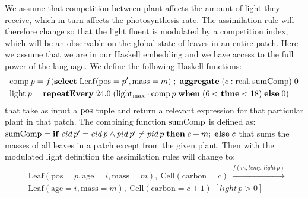 We assume that competition between plant affects the amount of light they
receive, which in turn affects the photosynthesis rate. The assimilation rule
will therefore change so that the light fluent is modulated by a competition
index, which will be an observable on the global state of leaves in an entire
patch. Here we assume that we are in our Haskell embedding and we have access to
the full power of the language. We define the following Haskell functions:
\begin{align*}
& \mathrm{comp} \: p = f (\mathbf{select} \; \mathrm{Leaf}(\mathrm{pos}=p' ,
  \mathrm{mass} = m) \; ; \; \mathbf{aggregate} \; (c: \mathrm{real}. \,
  \mathrm{sumComp}) \; 0 \\
& \mathrm{light} \: p = \mathbf{repeatEvery} \; 24.0 \; (\mathrm{light_{max}
                          } \cdot \mathrm{comp} \, p \; \mathbf{when} \; (6 < \mathbf{time} < 18) \; \mathbf{else} \; \mathrm{0})
\end{align*}
that take as input a $\mathrm{pos}$ tuple and return a relevant expression for that
particular plant in that patch. The combining function $\mathrm{sumComp}$ is defined
as: $\mathrm{sumComp} = \mathbf{if}\; cid \, p' = cid \, p \land pid \, p' \neq pid \, p
\;\mathbf{then} \; c + m; \; \mathbf{else} \; c$ that sums the masses of all
leaves in a patch except from the given plant. Then with the modulated light
definition the assimilation rules will change to:
\begin{align*}
& \mathrm{Leaf}(\mathrm{pos} \!= \!p, \mathrm{age} \!= \!i, \mathrm{mass} \!= \!m), \:
                 \mathrm{Cell}(\mathrm{carbon} \!= \!c) \: \xrightarrow{f(m,
                 temp, light \, p)}  \\
&\mathrm{Leaf}(\mathrm{age} \!= \!i, \mathrm{mass} \!= \!m), \:
  \mathrm{Cell}(\mathrm{carbon} \!= \!c+1) \; [light \, p > 0]
\end{align*}

